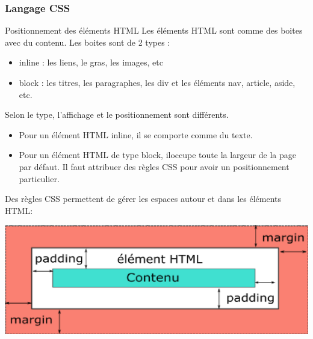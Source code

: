 \documentclass[8pt]{beamer}
\begin{document}
\begin{frame}
\frametitle{Langage CSS}

\begin{block}{Positionnement des éléments HTML}
Les éléments HTML sont comme des boites avec du contenu. Les boites sont de 2 types :
\begin{itemize}
\item inline : les liens, le gras, les images, etc
\item block : les titres, les paragraphes, les div et les éléments nav, article, aside, etc.
\end{itemize}
Selon le type, l'affichage et le positionnement sont différents.
\begin{itemize}
\item Pour un élément HTML inline, il se comporte comme du texte.
\item Pour un élément HTML de type block, iloccupe toute la largeur de la page par défaut. Il faut attribuer des règles CSS pour avoir un positionnement particulier.
\end{itemize}
Des règles CSS permettent de gérer les espaces autour et dans les éléments HTML:

\begin{center}
\includegraphics[scale=0.45]{img/margin-padding.eps}
\end{center}
\end{block}
\end{frame}





%
%
\end{document}
